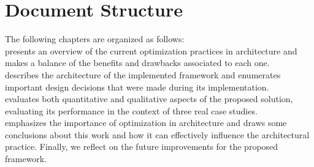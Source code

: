 \section{Document Structure}
The following chapters are organized as follows: \\ 
\textbf{} presents an overview of the current optimization practices in architecture and makes a balance of the benefits and drawbacks associated to each one.  \\
\textbf{} describes the architecture of the implemented framework and enumerates important design decisions that were made during its implementation. \\
\textbf{} evaluates both quantitative and qualitative aspects of the proposed solution, evaluating its performance in the context of three real case studies. \\
\textbf{} emphasizes the importance of optimization in architecture and draws some conclusions about this work and how it can effectively influence the architectural practice. Finally, we reflect on the future improvements for the proposed framework. \\
